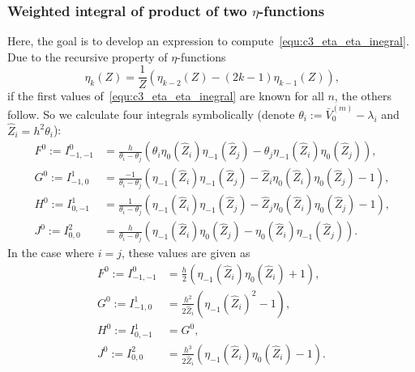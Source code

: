 \subsubsection{Weighted integral of product of two \texorpdfstring{$\eta$}{eta}-functions}

Here, the goal is to develop an expression to compute~\eqref{equ:c3_eta_eta_inegral}. Due to the recursive property of $\eta$-functions
$$
  \eta_k(Z) = \frac{1}{Z}\left(\eta_{k-2}(Z) - (2k-1)\eta_{k-1}(Z)  \right)\text{,}
$$
if the first values of~\eqref{equ:c3_eta_eta_inegral} are known for all $n$, the others follow. So we calculate four integrals symbolically (denote $\theta_i := \bar{V}_0^{(m)} -  \lambda_i$ and $\hat{Z}_i = h^2\theta_i$):
\begin{align*}
  F^0 := I_{-1,-1}^0 & = \frac{h}{\theta_i - \theta_j}\left(\theta_i \eta_0(\hat{Z}_i)\eta_{-1}(\hat{Z}_j) - \theta_j \eta_{-1}(\hat{Z}_i)\eta_0(\hat{Z}_j)\right) \text{,}   \\
  G^0 := I_{-1, 0}^1 & = \frac{-1}{\theta_i - \theta_j}\left(\eta_{-1}(\hat{Z}_i)\eta_{-1}(\hat{Z}_j) - \hat{Z}_i \eta_{0}(\hat{Z}_i)\eta_{0}(\hat{Z}_j)  - 1\right) \text{,} \\
  H^0 := I_{0, -1}^1 & = \frac{1}{\theta_i - \theta_j}\left(\eta_{-1}(\hat{Z}_i)\eta_{-1}(\hat{Z}_j) - \hat{Z}_j \eta_{0}(\hat{Z}_i)\eta_{0}(\hat{Z}_j)  - 1\right) \text{,}  \\
  J^0 := I_{0,0}^{2} & = \frac{h}{\theta_i - \theta_j}\left(\eta_{-1}(\hat{Z}_i)\eta_{0}(\hat{Z}_j) - \eta_{0}(\hat{Z}_i)\eta_{-1}(\hat{Z}_j)\right) \text{.}
\end{align*}
In the case where $i = j$, these values are given as
\begin{align*}
  F^0 := I_{-1,-1}^0 & = \frac{h}{2} \left(\eta_{-1}(\hat{Z}_i) \eta_{0}(\hat{Z}_i) + 1\right) \text{,}             \\
  G^0 := I_{-1, 0}^1 & = \frac{h^2}{2 \hat{Z}_i} \left(\eta_{-1}(\hat{Z}_i)^2 - 1\right) \text{,}                   \\
  H^0 := I_{0, -1}^1 & = G^0 \text{,}                                                                               \\
  J^0 := I_{0,0}^{2} & = \frac{h^3}{2 \hat{Z}_i} \left(\eta_{-1}(\hat{Z}_i) \eta_{0}(\hat{Z}_i) - 1\right) \text{.}
\end{align*}


